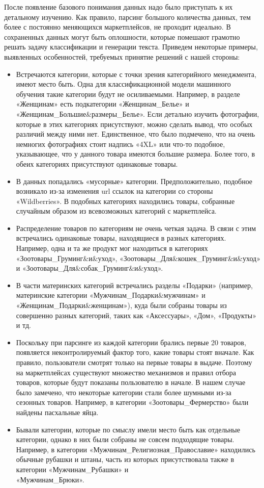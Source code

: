 \documentclass[a4paper,12pt]{extarticle}
\begin{document}
После появление базового понимания данных надо было приступать к их детальному изучению. Как правило, парсинг большого количества данных, тем более с постоянно меняющихся маркетплейсов, не проходит идеально. В сохраненных данных могут быть оплошности, которые помешают грамотно решать задачу классификации и генерации текста. Приведем некоторые примеры, выявленных особенностей, требуемых принятие решений с нашей стороны:
\begin{itemize}
	\item Встречаются категории, которые с точки зрения категорийного менеджмента, имеют место быть. Одна для классификационной модели машинного обучения такие категории будут не осиливаемыми. Например, в разделе «Женщинам» есть подкатегории «Женщинам\_Белье» и «Женщинам\_Большие\&размеры\_Белье». Если детально изучить фотографии, которые в этих категориях присутствуют, можно сделать вывод, что особых различий между ними нет. Единственное, что было подмечено, что на очень немногих фотографиях стоит надпись «4XL» или что-то подобное, указывающее, что у данного товара имеются большие размера. Более того, в обеих категориях присутствуют одинаковые товары.
	\item В данных попадались «мусорные» категории. Предположительно, подобное возникало из-за изменения url ссылок на категории со стороны «Wildberries». В подобных категориях находились товары, собранные случайным образом из всевозможных категорий с маркетплейса.
	\item Распределение товаров по категориям не очень четкая задача. В связи с этим встречались одинаковые товары, находящиеся в разных категориях. Например, одна и та же продукт мог находиться в категориях «Зоотовары\_Груминг\&и\&уход», «Зоотовары\_Для\&кошек\_Груминг\&и\&уход» и «Зоотовары\_Для\&собак\_Груминг\&и\&уход».
	\item В части материнских категорий встречались разделы «Подарки» (например, материнские категории «Мужчинам\_Подарки\&мужчинам» и \\ «Женщинам\_Подарки\&женщинам»), куда были собраны товары из совершенно разных категорий, таких как «Аксессуары», «Дом», «Продукты» и тд.
	\item Поскольку при парсинге из каждой категории брались первые 20 товаров, появляется неконтролируемый фактор того, какие товары стоят вначале. Как правило, пользователи смотрят только на первые товары в выдаче. Поэтому на маркетплейсах существуют множество механизмов и правил отбора товаров, которые будут показаны пользователю в начале. В нашем случае было замечено, что некоторые категории стали более шумными из-за сезонных товаров. Например, в категории «Зоотовары\_Фермерство» были найдены пасхальные яйца.
	\item Бывали категории, которые по смыслу имели место быть как отдельные категории, однако в них были собраны не совсем подходящие товары. Например, в категории «Мужчинам\_Религиозная\_Православие» находились обычные рубашки и штаны, часть из которых присутствовала также в категории «Мужчинам\_Рубашки» и\\ «Мужчинам\_Брюки».
\end{itemize}
\end{document}

